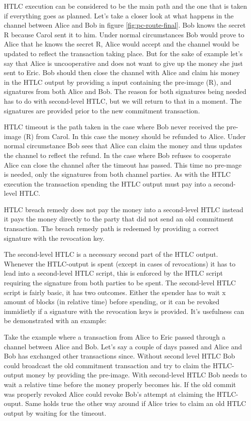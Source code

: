 HTLC execution can be considered to be the main path and the one that is taken if everything goes as planned. Let's take a closer look at what happens in the channel between Alice and Bob in figure \ref{fig:pc-route-final}. Bob knows the secret R because Carol sent it to him. Under normal circumstances Bob would prove to Alice that he knows the secret R, Alice would accept and the channel would be updated to reflect the transaction taking place. But for the sake of example let's say that Alice is uncooperative and does not want to give up the money she just sent to Eric. 
Bob should then close the channel with Alice and claim his money in the HTLC output by providing a input containing the pre-image (R), and signatures from both Alice and Bob. The reason for both signatures being needed has to do with second-level HTLC, but we will return to that in a moment. The signatures are provided prior to the new commitment transaction.

HTLC timeout is the path taken in the case where Bob never received the pre-image (R) from Carol. In this case the money should be refunded to Alice. Under normal circumstance Bob sees that Alice can claim the money and thus updates the channel to reflect the refund. In the case where Bob refuses to cooperate Alice can close the channel after the timeout has passed. This time no pre-mage is needed, only the signatures from both channel parties. As with the HTLC execution the transaction spending the HTLC output must pay into a second-level HTLC.

HTLC breach remedy does not pay the money into a second-level HTLC instead it pays the money directly to the party that did not send an old commitment transaction. The breach remedy path is redeemed by providing a correct signature with the revocation key.

The second-level HTLC is a necessary second part of the HTLC output. Whenever the HTLC-output is spent (except in cases of revocations) it has to lead into a second-level HTLC script, this is enforced by the HTLC script requiring the signature from both parties to be spent. The second-level HTLC script is fairly basic, it has two outcomes. Either the spender has to wait x amount of blocks (in relative time) before spending, or it can be revoked immidietly if a signature with the revocation keys is provided. It's usefulness can be demonstrated with an example:

Take the example where a transaction from Alice to Eric passed through a channel between Alice and Bob. Let's say a couple of days passed and Alice and Bob has exchanged other transactions since. Without second level HTLC Bob could broadcast the old commitment transaction and try to claim the HTLC-output money by providing the pre-image. With second-level HTLC Bob needs to wait a relative time before the money properly becomes his. If the old commit was properly revoked Alice could revoke Bob's attempt at claiming the HTLC-ouput. Same holds true the other way around if Alice tries to claim an old HTLC output by waiting for the timeout.

